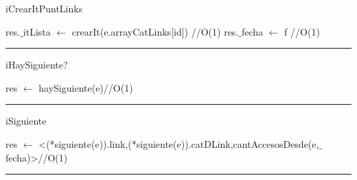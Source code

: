 \begin{algorithm}[H]
\caption{iCrearItPuntLinks}
\begin{algorithmic}[1]
\state res.$\_$itLista $\gets$ crearIt(e.arrayCatLinks[id]) \hfill //O(1)
\state res.$\_$fecha $\gets$ f \hfill //O(1)
\EndFunction 
\end{algorithmic}
\hrule
{}
\end{algorithm}

\begin{algorithm}[H]
\caption{iHaySiguiente?}
\begin{algorithmic}[1]
\state res $\gets$ haySiguiente(e)\hfill //O(1)
\EndFunction 
\end{algorithmic}
\hrule
{}
\end{algorithm}

\begin{algorithm}[H]
\caption{iSiguiente}
\begin{algorithmic}[1]
\state res $\gets$ <(*siguiente(e)).link,(*siguiente(e)).catDLink,cantAccesosDesde(e,$\_$fecha)>\hfill //O(1)
\EndFunction 
\end{algorithmic}
\hrule
{}
\end{algorithm}




